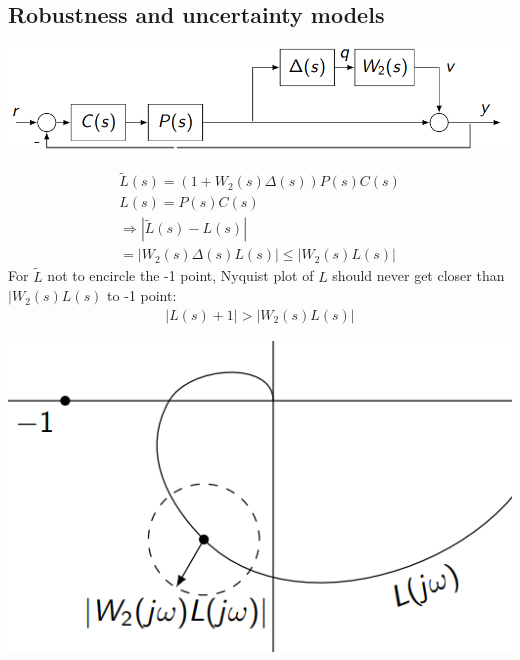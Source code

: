 \subsection{Robustness and uncertainty models}
    \includegraphics[width = \linewidth]{src/images/uncertainty_block_diagram.png}
    \begin{minipage}{0.58\linewidth}
        \begin{align*}
            \tilde L(s) = (1 + W_2(s) \Delta(s)) P(s) C(s)\\
            L(s) = P(s) C(s)\\
            \Rightarrow |\tilde L(s) - L(s)|\\
            = |W_2(s) \Delta(s) L(s)| \leq |W_2(s) L(s)|
        \end{align*}
        For $\tilde L$ not to encircle the -1 point, Nyquist plot of $L$ should never get closer than $|W_2(s) L(s)$ to -1 point:
        \begin{align*}
            |L(s) + 1| > |W_2(s) L(s)|
        \end{align*}
    \end{minipage}
    \begin{minipage}{0.40\linewidth}
        \includegraphics[width = \linewidth]{src/images/uncertainty_nyquist.png}
    \end{minipage}